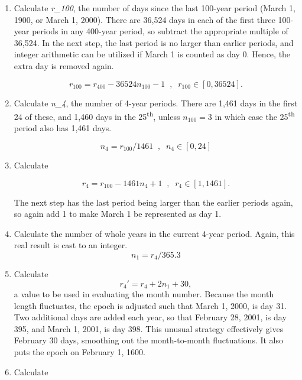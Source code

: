 {\begin{enumerate}
{\begin{enumerate}
\begin{enumerate}
\begin{equation*}
n_{100} = int ( r_{400} / 36524.3 )
\end{equation*}

\item Calculate \textit{r\_100}, the number of days since the last
100-year period (March 1, 1900, or March 1, 2000).  There are 36,524
days in each of the first three 100-year periods in any 400-year period, so
subtract the appropriate multiple of 36,524.  In the next step, the last
period is no larger than earlier periods, and integer arithmetic can be
utilized if March 1 is counted as day 0.  Hence, the extra day is
removed again.

\begin{equation*}
r_{100}=r_{400}-36524n_{100}-1\; \; , \; \;
r_{100}\in[0,36524].
\end{equation*}

\item Calculate \textit{n\_4}, the number of 4-year periods.  There are
1,461 days in the first 24 of these, and 1,460 days in the
25\textsuperscript{th}, unless  $n_{100}=3$ in which case the
25\textsuperscript{th} period also has 1,461 days.


\begin{equation*}
n_{4}=r_{100}/1461 \; \; , \; \; n_{4}\in [0,24]
\end{equation*}

\item Calculate

\begin{equation*}
r_{4}=r_{100}-1461n_{4}+1 \; \; , \; \;  r_{4}\in [1,1461].
\end{equation*}

The
next step has the last period being larger than the earlier periods
again, so again add 1 to make March 1 be represented as day 1.
\item Calculate the number of whole years in the
current 4-year period.  Again, this real result is cast to an integer.
\begin{equation*}
n_{1}=r_{4}/365.3
\end{equation*}

\item Calculate
\begin{equation*}
r_{4}'=r_{4}+2n_{1}+30,
\end{equation*}
a value to be used in
evaluating the month number.  Because the month length fluctuates, the
epoch is adjusted such that March 1, 2000, is day 31.  Two additional
days are added each year, so that February 28, 2001, is day 395, and
March 1, 2001, is day 398.  This unusual strategy effectively gives
February 30 days, smoothing out the month-to-month fluctuations.  It
also puts the epoch on February 1, 1600.
\item Calculate


\end{enumerate}
\end{enumerate}}
\end{enumerate}}
